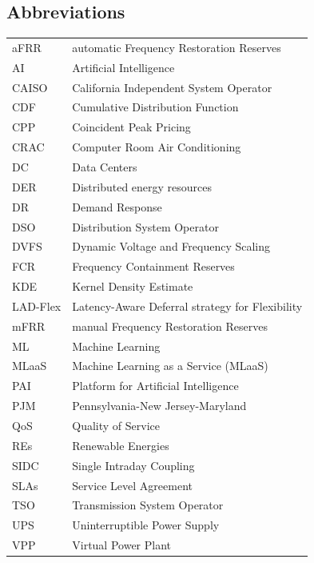 \documentclass[preprint,12pt]{elsarticle}
\begin{document}
\subsection*{Abbreviations}
\begin{tabular}{ll}
aFRR & automatic Frequency Restoration Reserves \\
AI & Artificial Intelligence\\
CAISO & California Independent System Operator \\
CDF & Cumulative Distribution Function \\
CPP & Coincident Peak Pricing \\
CRAC & Computer Room Air Conditioning \\
DC & Data Centers \\
DER & Distributed energy resources \\
DR & Demand Response \\
DSO & Distribution System Operator \\
DVFS & Dynamic Voltage and Frequency Scaling \\
FCR & Frequency Containment Reserves \\
KDE & Kernel Density Estimate \\
LAD-Flex & Latency-Aware Deferral strategy for Flexibility \\
mFRR & manual Frequency Restoration Reserves \\
ML & Machine Learning \\
MLaaS & Machine Learning as a Service (MLaaS) \\
PAI & Platform for Artificial Intelligence \\
PJM & Pennsylvania-New Jersey-Maryland \\
QoS & Quality of Service \\
REs & Renewable Energies \\
SIDC & Single Intraday Coupling \\
SLAs & Service Level Agreement \\
TSO & Transmission System Operator \\
UPS & Uninterruptible Power Supply \\
VPP & Virtual Power Plant\\  
\end{tabular}

\vspace{1em}
\end{document}
